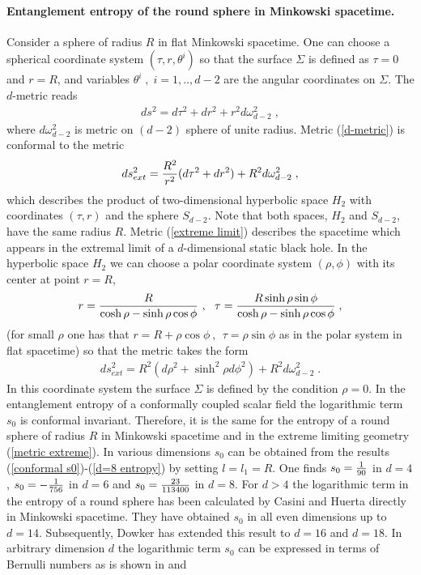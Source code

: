 \documentclass[12pt]{article}
\def\be{\begin{eqnarray}}
\def\ee{\end{eqnarray}}
\def\lb{\label}
\def\o{\over}
\begin{document}
\paragraph{Entanglement entropy of the round sphere in Minkowski spacetime.}
Consider  a sphere of radius $R$ in flat Minkowski spacetime. One can choose a spherical coordinate system $(\tau,r,\theta^i)$ so that the surface $\Sigma$ 
is defined as $\tau=0$ and $r=R$, and variables $\theta^i\; , \; i=1,..,d-2$ are the angular coordinates on $\Sigma$. The $d$-metric reads
\be
ds^2=d\tau^2+dr^2+r^2d\omega^2_{d-2}\; ,
\lb{d-metric}
\ee
where $d\omega^2_{d-2}$ is metric on $(d-2)$ sphere of unite radius.  Metric (\ref{d-metric}) is conformal to the metric
\be
ds_{ext}^2={R^2\o r^2}(d\tau^2+dr^2)+R^2d\omega^2_{d-2}\; ,
\lb{extreme limit}
\ee
which describes the product of two-dimensional hyperbolic space $H_2$ with coordinates $(\tau,r)$ and the sphere $S_{d-2}$.
Note that both spaces, $H_2$ and $S_{d-2}$, have the same radius $R$. Metric (\ref{extreme limit}) describes the spacetime which appears in the extremal
limit of a $d$-dimensional static black hole. In the hyperbolic space $H_2$ we can choose a polar coordinate system $(\rho,\phi)$  with its center at point $r=R$,
\be
r={R\o \cosh\rho-\sinh\rho\cos\phi}~,~~\tau={R\sinh\rho\sin\phi\o \cosh\rho-\sinh\rho\cos\phi}\; ,
\lb{transfo}
\ee
(for small $\rho$ one has that $r=R+\rho\cos\phi~,~~\tau=\rho\sin\phi$ as in the polar system in flat spacetime)
so that the metric takes the form
\be
ds_{ext}^2=R^2(d\rho^2+\sinh^2\rho d\phi^2)+R^2 d\omega^2_{d-2}\; .
\lb{metric extreme}
\ee
In this coordinate system the surface $\Sigma$ is defined by the condition $\rho=0$.
In the entanglement entropy of a conformally coupled scalar  field the logarithmic term $s_0$ is conformal invariant. Therefore, it is the same \cite{Solodukhin-2010} for the entropy of a round sphere of radius $R$ in Minkowski spacetime and 
in the extreme limiting geometry (\ref{metric extreme}). In various dimensions $s_0$ can be obtained from the results (\ref{conformal s0})-(\ref{d=8 entropy}) by setting
$l=l_1=R$. One finds  $s_0={1\o 90}$ in $d=4$, $s_0=-{1\o 756}$ in $d=6$ and $s_0={23\o 113400}$ in $d=8$. 
For $d>4$ the logarithmic term in the entropy of a round sphere has been calculated by  Casini and Huerta \cite{Casini:2010kt} directly in Minkowski spacetime. 
They have obtained $s_0$ in all even dimensions  up to $d=14$. Subsequently, Dowker \cite{Dowker:2010nq} has extended this result to $d=16$ and $d=18$. In arbitrary dimension
$d$ the logarithmic term $s_0$ can be expressed in terms of Bernulli  numbers as is shown in  \cite{Casini:2010kt} and  \cite{Dowker:2010nq}
\end{document}
